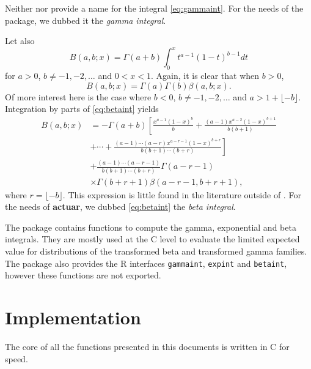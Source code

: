 \documentclass[x11names]{article}
\newcommand{\proglang}[1]{\textsf{#1}}
\newcommand{\pkg}[1]{\textbf{#1}}
\newcommand{\code}[1]{\texttt{#1}}
\begin{document}
Neither \citet{LossModels4e} nor \citet{Abramowitz:1972} provide a
name for the integral \eqref{eq:gammaint}. For the needs of the
package, we dubbed it the \emph{gamma integral}.

Let also
\begin{equation}
  \label{eq:betaint}
  B(a, b; x) = \Gamma(a + b) \int_0^x t^{a-1} (1-t)^{b-1} dt
\end{equation}
for $a > 0$, $b \neq -1, -2, \dots$ and $0 < x < 1$. Again, it is
clear that when $b > 0$,
\begin{equation*}
  B(a, b; x) = \Gamma(a) \Gamma(b) \beta(a, b; x).
\end{equation*}
Of more interest here is the case where $b < 0$,
$b \neq -1, -2, \dots$ and $a > 1 + \lfloor -b\rfloor$. Integration by
parts of \eqref{eq:betaint} yields
\begin{equation}
  \label{eq:betaint:bneg}
  \begin{split}
    B(a, b; x)
    &= \displaystyle
    -\Gamma(a + b) \left[ \frac{x^{a-1} (1-x)^b}{b}
      + \frac{(a-1) x^{a-2} (1-x)^{b+1}}{b (b+1)} \right. \\
    &  \displaystyle\left.
      + \cdots + \frac{(a-1) \cdots (a-r) x^{a-r-1}
        (1-x)^{b+r}}{b (b+1) \cdots (b+r)} \right] \\
    &   \displaystyle
    + \frac{(a-1) \cdots (a-r-1)}{b (b+1) \cdots (b+r)}
    \Gamma(a-r-1) \\
    &  \times \Gamma(b+r+1) \beta(a-r-1, b+r+1),
  \end{split}
\end{equation}
where $r = \lfloor -b\rfloor$. This expression is little found in the
literature outside of \citet{LossModels4e}. For the needs of
\pkg{actuar}, we dubbed \eqref{eq:betaint} the \emph{beta
  integral}.

The package contains functions to compute the gamma, exponential
and beta integrals. They are mostly used at the \proglang{C} level
to evaluate the limited expected value for distributions of the
transformed beta and transformed gamma families. The package also
provides the R interfaces \code{gammaint}, \code{expint} and
\code{betaint}, however these functions are not exported.


\section{Implementation}
\label{sec:implementation}

The core of all the functions presented in this documents is written
in \proglang{C} for speed.
\end{document}

